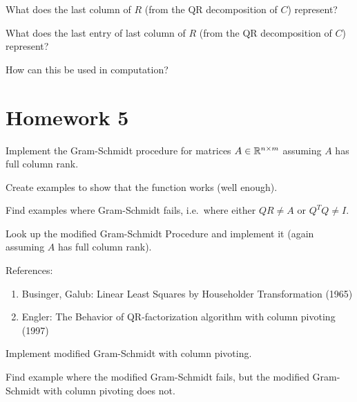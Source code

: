 \documentclass[]{book}
\providecommand{\tightlist}{%
  \setlength{\itemsep}{0pt}\setlength{\parskip}{0pt}}
\theoremstyle{definition}
\theoremstyle{definition}
\theoremstyle{definition}
\theoremstyle{remark}
\let\BeginKnitrBlock\begin \let\EndKnitrBlock\end
\begin{document}
\BeginKnitrBlock{exercise}
\protect\hypertarget{exr:q407}{}{\label{exr:q407} }What does the last column
of \(R\) (from the QR decomposition of \(C\)) represent?
\EndKnitrBlock{exercise}

\BeginKnitrBlock{exercise}
\protect\hypertarget{exr:q408}{}{\label{exr:q408} }What does the last entry
of last column of \(R\) (from the QR decomposition of \(C\)) represent?
\EndKnitrBlock{exercise}

\BeginKnitrBlock{exercise}
\protect\hypertarget{exr:q409}{}{\label{exr:q409} }How can this be used in
computation?
\EndKnitrBlock{exercise}

\section{Homework 5}\label{homework-5}

\BeginKnitrBlock{exercise}
\protect\hypertarget{exr:q501}{}{\label{exr:q501} }Implement the
Gram-Schmidt procedure for matrices \(A \in \mathbb{R}^{n \times m}\) assuming
\(A\) has full column rank.

Create examples to show that the function works (well enough).
\EndKnitrBlock{exercise}

\BeginKnitrBlock{exercise}
\protect\hypertarget{exr:q502}{}{\label{exr:q502} }Find examples where
Gram-Schmidt fails, i.e.~where either \(Q R \neq A\) or \(Q^TQ \neq I\).
\EndKnitrBlock{exercise}

\BeginKnitrBlock{exercise}
\protect\hypertarget{exr:q503}{}{\label{exr:q503} }Look up the modified
Gram-Schmidt Procedure and implement it (again assuming \(A\) has full
column rank).
\EndKnitrBlock{exercise}

\BeginKnitrBlock{exercise}[Pivoting (*OPTIONAL*)]
\protect\hypertarget{exr:q504}{}{\label{exr:q504} \iffalse (Pivoting
(\emph{OPTIONAL})) \fi{} }References:

\begin{enumerate}
\def\labelenumi{\arabic{enumi}.}
\tightlist
\item
  Businger, Galub: Linear Least Squares by Householder Transformation
  (1965)
\item
  Engler: The Behavior of QR-factorization algorithm with column
  pivoting (1997)
\end{enumerate}

Implement modified Gram-Schmidt with column pivoting.

Find example where the modified Gram-Schmidt fails, but the modified
Gram-Schmidt with column pivoting does not.
\EndKnitrBlock{exercise}
\end{document}

